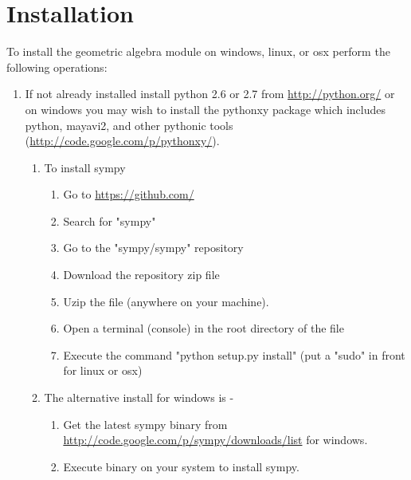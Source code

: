 \documentclass[10pt]{article}
\begin{document}
\section{Installation}

To install the geometric algebra module on windows, linux, or osx perform the following operations:

	\begin{enumerate}
    \item If not already installed install python 2.6 or 2.7 from \url{http://python.org/} or on windows
       you may wish to install the pythonxy package which includes python, mayavi2, and other pythonic
       tools (\url{http://code.google.com/p/pythonxy/}).
	   \begin{enumerate}
       \item To install sympy
          \begin{enumerate}
           \item Go to \url{https://github.com/}
           \item Search for "sympy"
           \item Go to the "sympy/sympy" repository
           \item Download the repository zip file
           \item Uzip the file (anywhere on your machine).
           \item Open a terminal (console) in the root directory of the file
           \item Execute the command "python setup.py install" (put a "sudo" in front for linux or osx)          
          \end{enumerate}
        \item The alternative install for windows is -
          \begin{enumerate}
           \item Get the latest sympy binary from \url{http://code.google.com/p/sympy/downloads/list} for windows.
           \item Execute binary on your system to install sympy.	 
           \end{enumerate}  
	   \end{enumerate}


\end{enumerate}
\end{document}
